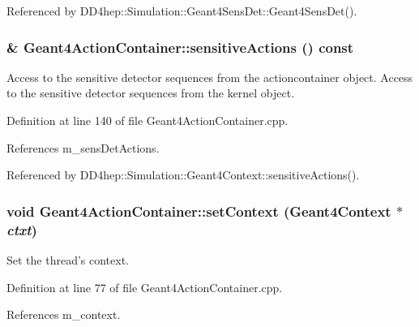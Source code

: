 Referenced by DD4hep::Simulation::Geant4SensDet::Geant4SensDet().\hypertarget{class_d_d4hep_1_1_simulation_1_1_geant4_action_container_a971e91e6d2d1d6ef8affe7038100a1a6}{
\subsubsection[{sensitiveActions}]{ \& Geant4ActionContainer::sensitiveActions () const}}
\label{class_d_d4hep_1_1_simulation_1_1_geant4_action_container_a971e91e6d2d1d6ef8affe7038100a1a6}


Access to the sensitive detector sequences from the actioncontainer object. Access to the sensitive detector sequences from the kernel object. 

Definition at line 140 of file Geant4ActionContainer.cpp.

References m\_\-sensDetActions.

Referenced by DD4hep::Simulation::Geant4Context::sensitiveActions().\hypertarget{class_d_d4hep_1_1_simulation_1_1_geant4_action_container_ae5f4903ca1043137f63f6b9054705b24}{
\subsubsection[{setContext}]{\setlength{\rightskip}{0pt plus 5cm}void Geant4ActionContainer::setContext ({\bf Geant4Context} $\ast$ {\em ctxt})}}
\label{class_d_d4hep_1_1_simulation_1_1_geant4_action_container_ae5f4903ca1043137f63f6b9054705b24}


Set the thread's context. 

Definition at line 77 of file Geant4ActionContainer.cpp.

References m\_\-context.


